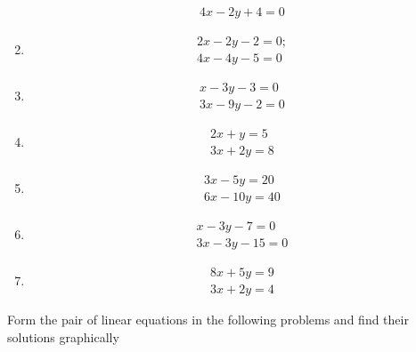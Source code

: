 \begin{enumerate}[label=\thesubsection.\arabic*,ref=\thesubsection.\theenumi]
\begin{align}
 	4x-2y+4=0
	\end{align}
\item \begin{align}
	2x-2y-2=0;\\
	4x-4y-5=0
	\end{align}
	\item \begin{align}
	x-3y-3=0\\
	3x-9y-2=0
        \end{align}
       \item \begin{align}
	2x+y=5\\
	3x+2y=8
	\end{align}
	\item \begin{align}
	3x-5y=20\\
	6x-10y=40
	\end{align}
	\item \begin{align}
	x-3y-7=0\\
	3x-3y-15=0
        \end{align}
\item \begin{align}
8x+5y=9
\\ 3x+2y=4
\end{align}
\end{enumerate}
Form the pair of linear equations in the following problems and find their solutions graphically
